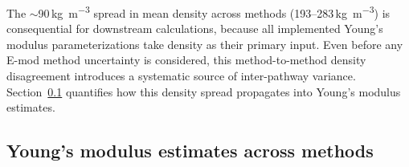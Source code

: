 \documentclass[hess, manuscript]{copernicus}
\begin{document}

The $\sim$90\,\si{kg.m^{-3}} spread in mean density across methods (193--283\,\si{kg.m^{-3}}) is consequential for downstream calculations, because all implemented Young's modulus parameterizations take density as their primary input. Even before any E-mod method uncertainty is considered, this method-to-method density disagreement introduces a systematic source of inter-pathway variance. Section~\ref{sec:emod_results} quantifies how this density spread propagates into Young's modulus estimates.


\FloatBarrier

\subsection{Young's modulus estimates across methods}
\label{sec:emod_results}

\end{document}
